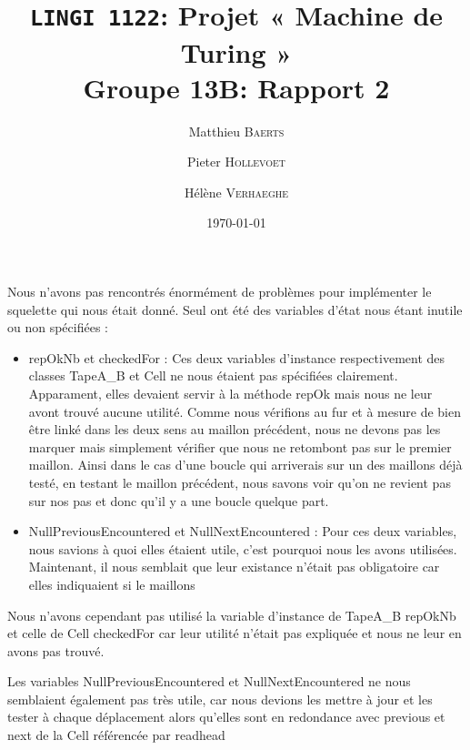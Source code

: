 \documentclass[a4paper,11pt]{article}
\title{\texttt{LINGI 1122}: Projet « Machine de Turing » \\ {\large Groupe 13B: Rapport 2}}
\author{Matthieu \textsc{Baerts} \and Pieter \textsc{Hollevoet} \and Hélène \textsc{Verhaeghe}}
\date{\today}
\begin{document}
\maketitle


Nous n'avons pas rencontrés énormément de problèmes pour implémenter le squelette qui nous était donné. Seul ont été des variables d'état nous étant inutile ou non spécifiées :
\begin{itemize}
\item repOkNb et checkedFor : Ces deux variables d'instance respectivement des classes TapeA\_B et Cell ne nous étaient pas spécifiées clairement. Apparament, elles devaient servir à la méthode repOk mais nous ne leur avont trouvé aucune utilité. Comme nous vérifions au fur et à mesure de bien être linké dans les deux sens au maillon précédent, nous ne devons pas les marquer mais simplement vérifier que nous ne retombont pas sur le premier maillon. Ainsi dans le cas d'une boucle qui arriverais sur un des maillons déjà testé, en testant le maillon précédent, nous savons voir qu'on ne revient pas sur nos pas et donc qu'il y a une boucle quelque part.
\item NullPreviousEncountered et NullNextEncountered : Pour ces deux variables, nous savions à quoi elles étaient utile, c'est pourquoi nous les avons utilisées. Maintenant, il nous semblait que leur existance n'était pas obligatoire car elles indiquaient si le maillons 


\end{itemize}

Nous n'avons cependant pas utilisé la variable d'instance de TapeA\_B repOkNb et celle de Cell checkedFor car leur utilité n'était pas expliquée et nous ne leur en avons pas trouvé.

Les variables NullPreviousEncountered et NullNextEncountered ne nous semblaient également pas très utile, car nous devions les mettre à jour et les tester à chaque déplacement alors qu'elles sont en redondance avec previous et next de la Cell référencée par readhead
\end{document}
